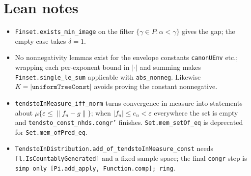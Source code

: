 \documentclass[11pt]{article}
\begin{document}
\section{Lean notes}
\begin{itemize}
\item \texttt{Finset.exists\_min\_image} on the filter $\{\gamma\in P:\alpha<\gamma\}$ gives the gap;
the empty case takes $\delta=1$.
\item No nonnegativity lemmas exist for the envelope constants \texttt{canonUEnv} etc.; wrapping
each per-exponent bound in $|\cdot|$ and summing makes \texttt{Finset.single\_le\_sum} applicable
with \texttt{abs\_nonneg}. Likewise $K=|\texttt{uniformTreeConst}|$ avoids proving the constant
nonnegative.
\item \texttt{tendstoInMeasure\_iff\_norm} turns convergence in measure into statements about
$\mu\{\varepsilon\le\|f_n-g\|\}$; when $|f_n|\le e_n<\varepsilon$ everywhere the set is empty and
\texttt{tendsto\_const\_nhds.congr'} finishes. \texttt{Set.mem\_setOf\_eq} is deprecated for
\texttt{Set.mem\_ofPred\_eq}.
\item \texttt{TendstoInDistribution.add\_of\_tendstoInMeasure\_const} needs
\texttt{[l.IsCountablyGenerated]} and a fixed sample space; the final \texttt{congr} step is
\texttt{simp only [Pi.add\_apply, Function.comp]; ring}.
\end{itemize}
\end{document}
